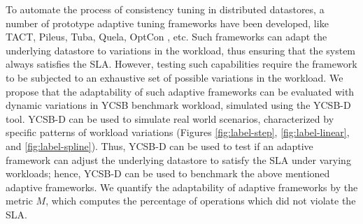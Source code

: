 \documentclass[conference]{IEEEtran}
\begin{document}
   To automate the process of consistency tuning in distributed datastores, a number of prototype
  adaptive tuning frameworks have been developed, like TACT,
   Pileus, Tuba, Quela,
   OptCon \cite{OptCOnCCGRid2016}, etc.
     Such frameworks can adapt the underlying datastore to variations in the workload, thus ensuring that the system always satisfies the SLA.
 However, testing such capabilities require the framework to be subjected to an exhaustive set of possible
 variations in the workload.
  We propose that the adaptability of such adaptive frameworks can be evaluated with dynamic variations in YCSB benchmark workload, simulated using the YCSB-D tool.
  YCSB-D can be used to simulate real world scenarios, characterized by specific patterns of workload variations (Figures \ref{fig:label-step}, \ref{fig:label-linear}, and \ref{fig:label-spline}).
  Thus, YCSB-D can be used to test if an adaptive framework can adjust the underlying datastore to satisfy the
  SLA under varying workloads; hence, YCSB-D can be used to benchmark the above mentioned adaptive frameworks.
  We quantify the adaptability of adaptive frameworks by the metric \emph{$M$}, which computes the percentage of operations which did not violate the SLA. %
\end{document}
